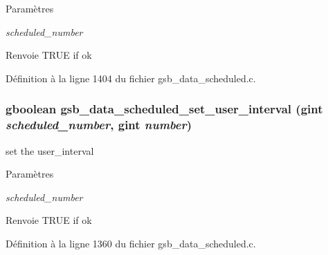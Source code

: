 \begin{DoxyParams}{Paramètres}
\item[{\em scheduled\_\-number}]\item[{\em }]\end{DoxyParams}
\begin{DoxyReturn}{Renvoie}
TRUE if ok 
\end{DoxyReturn}


Définition à la ligne 1404 du fichier gsb\_\-data\_\-scheduled.c.

\subsubsection[{gsb\_\-data\_\-scheduled\_\-set\_\-user\_\-interval}]{\setlength{\rightskip}{0pt plus 5cm}gboolean gsb\_\-data\_\-scheduled\_\-set\_\-user\_\-interval (gint {\em scheduled\_\-number}, \/  gint {\em number})}\label{gsb__data__scheduled_8h_aa4ef2d6501ecf7274a83c5d1d5d0ad03}
set the user\_\-interval


\begin{DoxyParams}{Paramètres}
\item[{\em scheduled\_\-number}]\item[{\em }]\end{DoxyParams}
\begin{DoxyReturn}{Renvoie}
TRUE if ok 
\end{DoxyReturn}


Définition à la ligne 1360 du fichier gsb\_\-data\_\-scheduled.c.

